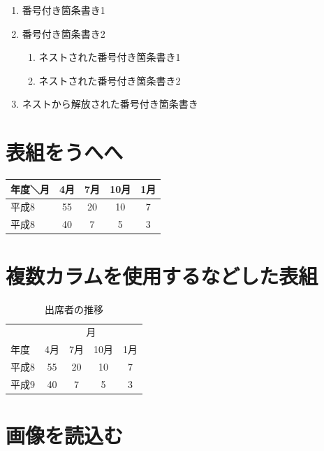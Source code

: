 \documentclass[10pt, twocolumn]{jarticle}
\begin{document}
\begin{enumerate}
  \item 番号付き箇条書き1
  \item 番号付き箇条書き2
  \begin{enumerate}
    \item ネストされた番号付き箇条書き1
    \item ネストされた番号付き箇条書き2
  \end{enumerate}
  \item ネストから解放された番号付き箇条書き
\end{enumerate}

\section{表組をうへへ}

\begin{center}
\begin{tabular}{|l|c|c|c|c|}\hline %
年度＼月 & 4月 & 7月 & 10月 & 1月 \\ \hline\hline
平成8    &  55 &  20 &   10 &   7 \\ \hline
平成8    &  40 &   7 &    5 &   3 \\ \hline
\end{tabular}
\end{center}

\section{複数カラムを使用するなどした表組}

\begin{table}[b]
\begin{center}
\caption{出席者の推移}
\begin{tabular}{|l|c|c|c|c|}\hline
        &  \multicolumn{4}{c|}{月} \\ \cline{2-5}
  年度  &  4月 & 7月 & 10月 & 1月  \\ \hline
  平成8 &  55  & 20  &  10  &  7   \\ \hline
  平成9 &  40  &  7  &   5  &  3   \\ \hline
\end{tabular}
\end{center}
\end{table}

\section{画像を読込む}
\end{document}
